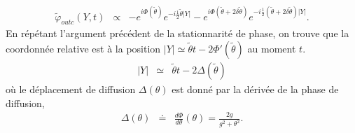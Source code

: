 \begin{eqnarray}
	\tilde{\varphi}_{outc} ( Y, t ) & \propto & -e^{i\Phi(\tilde{\theta})}e^{-i\frac{1}{2}\tilde{\theta} \vert Y\vert} - e^{i\Phi(\tilde{\theta} + 2 \delta \tilde{\theta} )}e^{-i\frac{1}{2}\left(\tilde{\theta} + 2\delta \tilde{\theta} \right) \vert Y\vert}. %
\end{eqnarray}
En répétant l'argument précédent de la stationnarité de phase, on trouve que la coordonnée relative est à la position $\vert Y \vert  \simeq \tilde{\theta} t - 2\Phi'( \tilde{\theta})$ au moment $t$. %
\begin{eqnarray}
	\vert Y \vert & \simeq & 	\tilde{\theta} t  - 2 \Delta (\tilde{\theta} )
\end{eqnarray}
où le déplacement de diffusion $\Delta (\theta)$ est donné par la dérivée de la phase de diffusion,
\begin{eqnarray}\label{eq:I-1-16}
	\Delta ( \theta ) & \doteq & \frac{ d \Phi }{ d \theta } ( \theta )= \frac{ 2 g }{ g^2 + \theta^2} . 	
\end{eqnarray}




